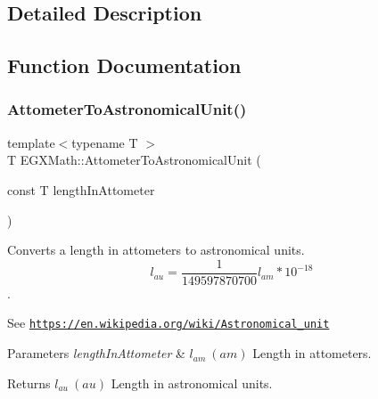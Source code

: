 \subsection{Detailed Description}


\subsection{Function Documentation}
\mbox{\label{group___e_g_x_math-_conversions-_length_conversions-_s_i-_attometer-_astronomical_ga194198d78186434768016c930eae1933}} 
\subsubsection{\texorpdfstring{Attometer\+To\+Astronomical\+Unit()}{AttometerToAstronomicalUnit()}}
{\footnotesize\ttfamily template$<$typename T $>$ \\
T E\+G\+X\+Math\+::\+Attometer\+To\+Astronomical\+Unit (\begin{DoxyParamCaption}\item[{const T}]{length\+In\+Attometer }\end{DoxyParamCaption})}



Converts a length in attometers to astronomical units. \[ l_{au}= \frac{1}{149597870700} l_{am} * 10^{-18}\]. 

See \href{https://en.wikipedia.org/wiki/Astronomical_unit}{\tt https\+://en.\+wikipedia.\+org/wiki/\+Astronomical\+\_\+unit} 
\begin{DoxyParams}{Parameters}
{\em length\+In\+Attometer} & $ l_{am}\ (am)$ Length in attometers. \\
\hline
\end{DoxyParams}
\begin{DoxyReturn}{Returns}
$ l_{au}\ (au)$ Length in astronomical units. 
\end{DoxyReturn}
\mbox{\label{group___e_g_x_math-_conversions-_length_conversions-_s_i-_attometer-_astronomical_gaca916475a6757e4eb793a7f09bbf46b1}} 
